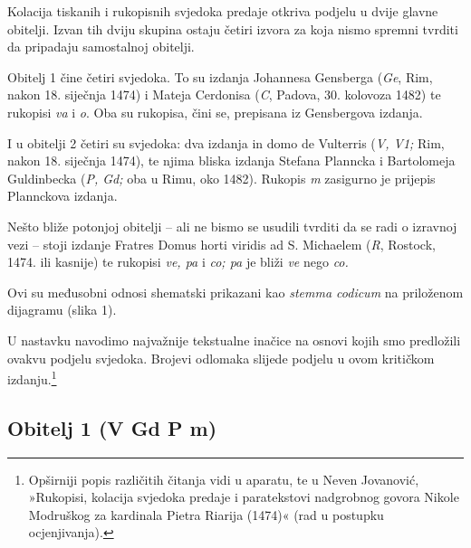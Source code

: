 \documentclass[a5paper,twoside]{article}
\begin{document}
Kolacija tiskanih i rukopisnih svjedoka predaje otkriva podjelu u dvije glavne obitelji. Izvan tih dviju skupina ostaju četiri izvora za koja nismo spremni tvrditi da pripadaju samostalnoj obitelji. 

Obitelj 1 čine četiri svjedoka. To su izdanja Johannesa Gensberga (\textit{Ge}, Rim, nakon 18. siječnja 1474) i Mateja Cerdonisa (\textit{C}, Padova, 30. kolovoza 1482) te rukopisi \textit{va} i \textit{o}. Oba su rukopisa, čini se, prepisana iz Gensbergova izdanja. 

I u obitelji 2 četiri su svjedoka: dva izdanja in domo de Vulterris (\textit{V, V1;} Rim, nakon 18. siječnja 1474), te njima bliska izdanja Stefana Planncka i Bartolomeja Guldinbecka (\textit{P, Gd;} oba u Rimu, oko 1482). Rukopis \textit{m} zasigurno je prijepis Plannckova izdanja. 

Nešto bliže potonjoj obitelji – ali ne bismo se usudili tvrditi da se radi o izravnoj vezi – stoji izdanje Fratres Domus horti viridis ad S. Michaelem (\textit{R}, Rostock, 1474. ili kasnije) te rukopisi \textit{ve, pa} i \textit{co; pa} je bliži \textit{ve} nego \textit{co.}

Ovi su međusobni odnosi shematski prikazani kao \textit{stemma codicum} na priloženom dijagramu (slika 1).

U nastavku navodimo najvažnije tekstualne inačice na osnovi kojih smo predložili ovakvu podjelu svjedoka. Brojevi odlomaka slijede podjelu u ovom kritičkom izdanju.\footnote{Opširniji popis različitih čitanja vidi u aparatu, te u Neven Jovanović, »Rukopisi, kolacija svjedoka predaje i paratekstovi nadgrobnog govora Nikole Modruškog za kardinala Pietra Riarija (1474)« (rad u postupku ocjenjivanja).}

\subsection{Obitelj 1 (V Gd P m)}
\end{document}
